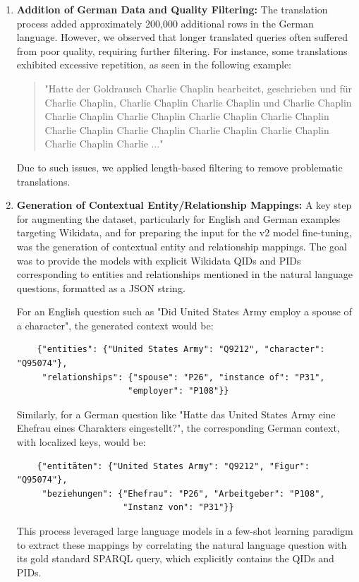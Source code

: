 \begin{enumerate}
    \item \textbf{Addition of German Data and Quality Filtering:}  
    The translation process added approximately 200,000 additional rows in the German language. However, we observed that longer translated queries often suffered from poor quality, requiring further filtering. For instance, some translations exhibited excessive repetition, as seen in the following example:  
    \begin{quote}
    "Hatte der Goldrausch Charlie Chaplin bearbeitet, geschrieben und für Charlie Chaplin, Charlie Chaplin Charlie Chaplin und Charlie Chaplin Charlie Chaplin Charlie Chaplin Charlie Chaplin Charlie Chaplin Charlie Chaplin Charlie Chaplin Charlie Chaplin Charlie Chaplin Charlie Chaplin Charlie ..."
    \end{quote}
    Due to such issues, we applied length-based filtering to remove problematic translations.

      \item \textbf{Generation of Contextual Entity/Relationship Mappings:} \label{item:context_generation}
    A key step for augmenting the dataset, particularly for English and German examples targeting Wikidata, and for preparing the input for the v2 model fine-tuning, was the generation of contextual entity and relationship mappings. 
    The goal was to provide the models with explicit Wikidata QIDs and PIDs corresponding to entities and relationships mentioned in the natural language questions, formatted as a JSON string.
    
    For an English question such as "Did United States Army employ a spouse of a character", the generated context would be:
    \begin{verbatim}
    {"entities": {"United States Army": "Q9212", "character": "Q95074"}, 
     "relationships": {"spouse": "P26", "instance of": "P31", 
                      "employer": "P108"}}
    \end{verbatim}
    Similarly, for a German question like "Hatte das United States Army eine Ehefrau eines Charakters eingestellt?", the corresponding German context, with localized keys, would be:
    \begin{verbatim}
    {"entitäten": {"United States Army": "Q9212", "Figur": "Q95074"}, 
     "beziehungen": {"Ehefrau": "P26", "Arbeitgeber": "P108", 
                     "Instanz von": "P31"}}
    \end{verbatim}
    This process leveraged large language models in a few-shot learning paradigm to extract these mappings by correlating the natural language question with its gold standard SPARQL query, which explicitly contains the QIDs and PIDs. 
    

\end{enumerate}
